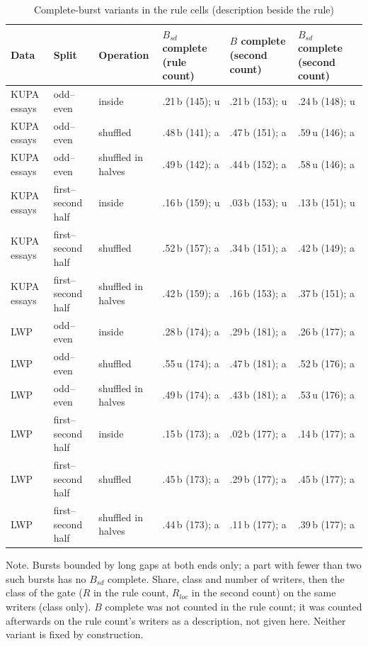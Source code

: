 \begin{table}[htbp]
\caption{Complete-burst variants in the rule cells (description beside the rule)}
\label{tab:complete}
\scriptsize
\begin{tabularx}{\linewidth}{@{}lllXXX@{}}
\toprule
Data & Split & Operation & $B_{sd}$ complete (rule count) & $B$ complete (second count) & $B_{sd}$ complete (second count) \\
\midrule
KUPA essays & odd--even & inside & .21\,b (145); u & .21\,b (153); u & .24\,b (148); u \\
KUPA essays & odd--even & shuffled & .48\,b (141); a & .47\,b (151); a & .59\,u (146); a \\
KUPA essays & odd--even & shuffled in halves & .49\,b (142); a & .44\,b (152); a & .58\,u (146); a \\
KUPA essays & first--second half & inside & .16\,b (159); u & .03\,b (153); u & .13\,b (151); u \\
KUPA essays & first--second half & shuffled & .52\,b (157); a & .34\,b (151); a & .42\,b (149); a \\
KUPA essays & first--second half & shuffled in halves & .42\,b (159); a & .16\,b (153); a & .37\,b (151); a \\
LWP & odd--even & inside & .28\,b (174); a & .29\,b (181); a & .26\,b (177); a \\
LWP & odd--even & shuffled & .55\,u (174); a & .47\,b (181); a & .52\,b (176); a \\
LWP & odd--even & shuffled in halves & .49\,b (174); a & .43\,b (181); a & .53\,u (176); a \\
LWP & first--second half & inside & .15\,b (173); a & .02\,b (177); a & .14\,b (177); a \\
LWP & first--second half & shuffled & .45\,b (173); a & .29\,b (177); a & .45\,b (177); a \\
LWP & first--second half & shuffled in halves & .44\,b (173); a & .11\,b (177); a & .39\,b (177); a \\
\bottomrule
\end{tabularx}
\par\smallskip\footnotesize Note. Bursts bounded by long gaps at both ends only; a part with fewer than two such bursts has no $B_{sd}$ complete. Share, class and number of writers, then the class of the gate ($R$ in the rule count, $R_{loc}$ in the second count) on the same writers (class only). $B$ complete was not counted in the rule count; it was counted afterwards on the rule count's writers as a description, not given here. Neither variant is fixed by construction.
\end{table}
